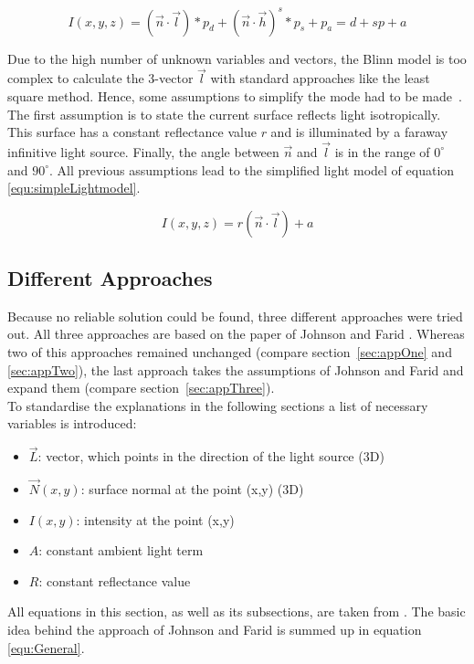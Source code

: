 \begin{equation}
\label{equ:Blinn}
I(x,y,z) = (\vec{n}\cdot \vec{l})*p_d + (\vec{n}\cdot\vec{h})^s*p_s + p_a = d + sp + a
\end{equation} 

Due to the high number of unknown variables and vectors, the Blinn model is too complex to calculate the 3-vector $\vec{l}$ with standard approaches like the least square method. Hence, some assumptions to simplify the mode had to be made~\cite{Johnson}. The first assumption is to state the current surface reflects light isotropically. This surface has a constant reflectance value $r$ and is illuminated by a faraway infinitive light source. Finally, the angle between $\vec{n}$ and  $\vec{l}$ is in the range of $0^\circ $ and $90^\circ$. All previous assumptions lead to the simplified light model of equation \ref{equ:simpleLightmodel}.

\begin{equation}
\label{equ:simpleLightmodel}
I(x,y,z) = r(\vec{n}\cdot \vec{l}) + a
\end{equation} 

\subsection{Different Approaches}\label{sec:approaches}
Because no reliable solution could be found, three different approaches were tried out. 
All three approaches are based on the paper of Johnson and Farid \cite{Johnson}. 
Whereas two of this approaches remained unchanged (compare section~\ref{sec:appOne} and \ref{sec:appTwo}), the last approach takes the assumptions of Johnson and Farid and expand them (compare section~\ref{sec:appThree}). \\
To standardise the explanations in the following sections a list of necessary variables is introduced: 
\begin{itemize}
\item $\vec{L}$: vector, which points in the direction of the light source (3D)
\item $\vec{N}(x,y)$: surface normal at the point (x,y) (3D)
\item $I(x,y)$: intensity at the point (x,y)
\item $A$: constant ambient light term
\item $R$: constant reflectance value
\end{itemize}
All equations in this section, as well as its subsections, are taken from \cite{Johnson}. The basic idea behind the approach of Johnson and Farid is summed up in equation \ref{equ:General}.

